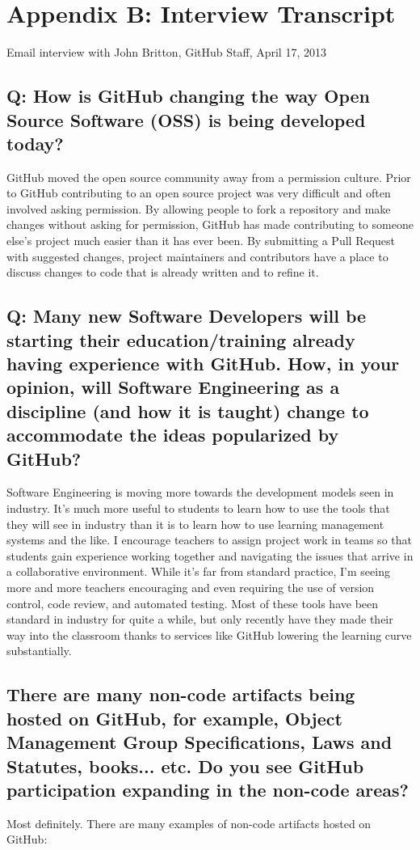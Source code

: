 \newpage

\section*{Appendix B: Interview Transcript}
Email interview with John Britton, GitHub Staff, April 17, 2013

\subsection*{Q: How is GitHub changing the way Open Source Software (OSS) is being developed today?}
GitHub moved the open source community away from a permission culture. Prior to GitHub contributing to an open source project was very difficult and often involved asking permission. By allowing people to fork a repository and make changes without asking for permission, GitHub has made contributing to someone else's project much easier than it has ever been. By submitting a Pull Request with suggested changes, project maintainers and contributors have a place to discuss changes to code that is already written and to refine it.

\subsection*{Q: Many new Software Developers will be starting their education/training already having experience with GitHub. How, in your opinion, will Software Engineering as a discipline (and how it is taught) change to accommodate the ideas popularized by GitHub?}

Software Engineering is moving more towards the development models seen in industry. It's much more useful to students to learn how to use the tools that they will see in industry than it is to learn how to use learning management systems and the like. I encourage teachers to assign project work in teams so that students gain experience working together and navigating the issues that arrive in a collaborative environment. While it's far from standard practice, I'm seeing more and more teachers encouraging and even requiring the use of version control, code review, and automated testing. Most of these tools have been standard in industry for quite a while, but only recently have they made their way into the classroom thanks to services like GitHub lowering the learning curve substantially.

\subsection*{There are many non-code artifacts being hosted on GitHub, for example, Object Management Group Specifications, Laws and Statutes, books... etc. Do you see GitHub participation expanding in the non-code areas?}
Most definitely. There are many examples of non-code artifacts hosted on GitHub:

